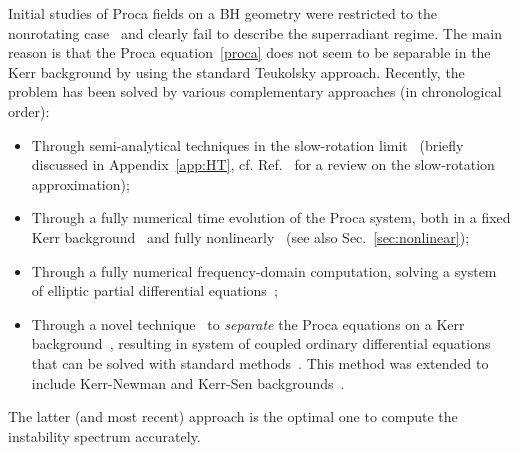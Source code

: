 \documentclass[11pt]{article}
\numberwithin{equation}{section} %
\begin{document}
Initial studies of Proca fields on a BH geometry were restricted to the nonrotating
case~\cite{Gal'tsov:1984nb,Herdeiro:2011uu,Rosa:2011my,Konoplya:2005hr} and clearly fail to describe the superradiant 
regime. The main reason is
that the Proca equation~\eqref{proca} does not seem to be separable in the Kerr background by using the standard 
Teukolsky approach. 
Recently, the problem has been solved by various complementary approaches (in chronological order):
\begin{itemize}
 \item Through semi-analytical techniques in 
the slow-rotation limit~\cite{Pani:2012vp,Pani:2012bp} (briefly discussed in Appendix~\ref{app:HT}, cf. 
Ref.~\cite{Pani:2013pma} for a review on the slow-rotation approximation);
 \item Through a fully numerical time evolution of the Proca system, both in a fixed Kerr 
background~\cite{Witek:2012tr} and fully nonlinearly~\cite{East:2017ovw,East:2018glu} (see also 
Sec.~\ref{sec:nonlinear});
 \item Through a fully numerical frequency-domain computation, solving a system of elliptic partial differential 
equations~\cite{Cardoso:2018tly,Baumann:2019eav};
 \item Through a novel technique~\cite{Frolov:2018pys} to \emph{separate} the Proca equations on a Kerr 
background~\cite{Frolov:2018ezx}, resulting in system of coupled ordinary differential equations that can be solved with 
standard methods~\cite{Dolan:2018dqv}. This method was extended to include Kerr-Newman and Kerr-Sen backgrounds~\cite{Cayuso:2019ieu}.
 \end{itemize}

The latter (and most recent) approach is the optimal one to compute the instability spectrum accurately.

 

\end{document}
